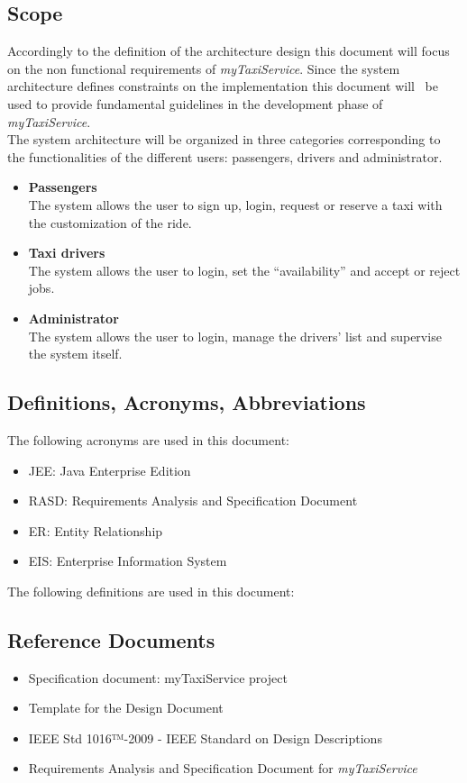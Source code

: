 \documentclass[a4paper,11pt]{report} %
\newcommand{\mts}{\mbox{\normalfont\itshape myTaxiService}}
\begin{document}
	\subsection{Scope} Accordingly to the definition of the architecture design this document will focus on the non functional requirements of \mts{}. 
	Since the system architecture  defines constraints on the implementation this document will  be  used to provide fundamental guidelines in the development phase of \mts{}.\\ \newline
	The system architecture will be organized in three categories corresponding to the functionalities of the different users: passengers, drivers and administrator.
	\begin{itemize}
		\item \textbf{Passengers} \\
		The system allows the user to sign up, login, request or reserve a taxi with the customization of the ride. 
		\item \textbf{Taxi drivers} \\
		The system allows the user to login, set the ``availability'' and accept or reject jobs.
		\item \textbf{Administrator} \\
		The system allows the user to login, manage the drivers' list and supervise the system itself.
	\end{itemize}
	
	\subsection{Definitions, Acronyms, Abbreviations}
	The following acronyms are used in this document:
	\begin{itemize}
		\item JEE: Java Enterprise Edition
		\item RASD: Requirements Analysis and Specification Document
		\item ER: Entity Relationship
		\item EIS: Enterprise Information System
	\end{itemize}
	The following definitions are used in this document:
	
	\subsection{Reference Documents}
	\begin{itemize}
		\item Specification document: myTaxiService project
		\item Template for the Design Document
		\item IEEE Std 1016™-2009 - IEEE Standard on Design Descriptions
		\item Requirements Analysis and Specification Document for \mts{}
	\end{itemize}
	
\end{document}

